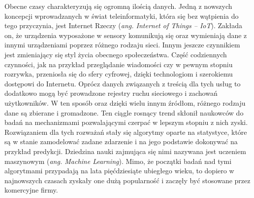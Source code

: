 
Obecne czasy charakteryzują się ogromną ilością danych. Jedną z nowszych koncepcji wprowadzanych w świat teleinformatyki, która się bez wątpienia do tego przyczynia, jest Internet Rzeczy (\textit{ang. Internet of Things --  IoT}). Zakłada on, że urządzenia wyposażone w sensory komunikują się oraz wymieniają dane z innymi urządzeniami poprzez różnego rodzaju sieci. Innym jeszcze czynnikiem jest zmieniający się styl życia obecnego społeczeństwa. Część codziennych czynności, jak na przykład przeglądanie  wiadomości czy w pewnym stopniu rozrywka, przeniosła się do sfery cyfrowej, dzięki technologiom i szerokiemu dostępowi do Internetu. Oprócz danych związanych z treścią dla tych usług to dodatkowo mogą być prowadzone rejestry ruchu sieciowego i zachowań użytkowników. W ten sposób oraz dzięki wielu innym źródłom, różnego rodzaju dane są zbierane i gromadzone. Ten ciągle rosnący trend skłonił naukowców do badań na  mechanizmami pozwalającymi czerpać w lepszym stopniu z nich zyski. Rozwiązaniem dla tych rozważań stały się algorytmy oparte na statystyce, które są w stanie zamodelować zadane zdarzenie i na jego podstawie dokonywać na przykład predykcji. Dziedzina nauki zajmująca się nimi nazywana jest uczeniem maszynowym ({\em ang. Machine Learning}). Mimo, że początki badań nad tymi algorytmami  przypadają na lata pięćdziesiąte ubiegłego wieku, to dopiero w najnowszych czasach zyskały one dużą popularność i zaczęły być stosowane przez komercyjne firmy. \par  


